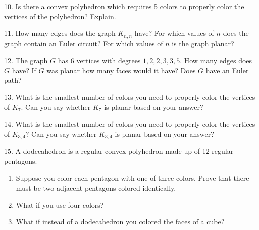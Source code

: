\documentclass[10pt,]{book}
\theoremstyle{plain}
\theoremstyle{definition}
\numberwithin{equation}{chapter}
\begin{document}
\begin{exerciselist}
\par\smallskip
\item[10.]\hypertarget{exercise-329}{}
            Is there a convex polyhedron which requires 5 colors to properly color the vertices of the polyhedron? Explain.
\par\smallskip
\item[11.]\hypertarget{exercise-330}{}
            How many edges does the graph \(K_{n,n}\) have? For which values of \(n\) does the graph contain an Euler circuit? For which values of \(n\) is the graph planar?
\par\smallskip
\item[12.]\hypertarget{exercise-331}{}
            The graph \(G\) has 6 vertices with degrees \(1, 2, 2, 3, 3, 5\). How many edges does \(G\) have? If \(G\) was planar how many faces would it have? Does \(G\) have an Euler path?
\par\smallskip
\item[13.]\hypertarget{exercise-332}{}
            What is the smallest number of colors you need to properly color the vertices of \(K_{7}\). Can you say whether \(K_7\) is planar based on your answer?
\par\smallskip
\item[14.]\hypertarget{exercise-333}{}
            What is the smallest number of colors you need to properly color the vertices of \(K_{3,4}\)? Can you say whether \(K_{3,4}\) is planar based on your answer?
\par\smallskip
\item[15.]\hypertarget{exercise-334}{}
            A dodecahedron is a regular convex polyhedron made up of 12 regular pentagons.
          \leavevmode%
\begin{enumerate}[label=(\alph*)]
\item\hypertarget{li-840}{}
                Suppose you color each pentagon with one of three colors. Prove that there must be two adjacent pentagons colored identically.
\item\hypertarget{li-841}{}
                What if you use four colors?
\item\hypertarget{li-842}{}
                What if instead of a dodecahedron you colored the faces of a cube?
\end{enumerate}


\end{exerciselist}
\end{document}
